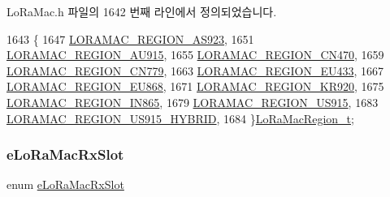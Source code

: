 Lo\+Ra\+Mac.\+h 파일의 1642 번째 라인에서 정의되었습니다.


\begin{DoxyCode}
1643 \{
1647     \mbox{\hyperlink{group___l_o_r_a_m_a_c_gga5d863ec55bc300e0ffeef88bcbeb70afa5b791cd5d892cd4ffdc891177f9c424f}{LORAMAC\_REGION\_AS923}},
1651     \mbox{\hyperlink{group___l_o_r_a_m_a_c_gga5d863ec55bc300e0ffeef88bcbeb70afa31c5134a31ba71dd67fffc7cd2e8d402}{LORAMAC\_REGION\_AU915}},
1655     \mbox{\hyperlink{group___l_o_r_a_m_a_c_gga5d863ec55bc300e0ffeef88bcbeb70afa8bf5c395dec14c8c24bc629e9cb4ab64}{LORAMAC\_REGION\_CN470}},
1659     \mbox{\hyperlink{group___l_o_r_a_m_a_c_gga5d863ec55bc300e0ffeef88bcbeb70afaa462c6a59045bcdbe27177b3c7d91ed0}{LORAMAC\_REGION\_CN779}},
1663     \mbox{\hyperlink{group___l_o_r_a_m_a_c_gga5d863ec55bc300e0ffeef88bcbeb70afa484c9c5522a1bd8411920cc7703d3977}{LORAMAC\_REGION\_EU433}},
1667     \mbox{\hyperlink{group___l_o_r_a_m_a_c_gga5d863ec55bc300e0ffeef88bcbeb70afadbfed23153fb6254b9ca2301ec19c24f}{LORAMAC\_REGION\_EU868}},
1671     \mbox{\hyperlink{group___l_o_r_a_m_a_c_gga5d863ec55bc300e0ffeef88bcbeb70afa2f45370a935e8767a90e19e24101f859}{LORAMAC\_REGION\_KR920}},
1675     \mbox{\hyperlink{group___l_o_r_a_m_a_c_gga5d863ec55bc300e0ffeef88bcbeb70afa58507c2e7248ab724cd3e0d0144ebd77}{LORAMAC\_REGION\_IN865}},
1679     \mbox{\hyperlink{group___l_o_r_a_m_a_c_gga5d863ec55bc300e0ffeef88bcbeb70afab2c106945b06878a5ded0cb466330412}{LORAMAC\_REGION\_US915}},
1683     \mbox{\hyperlink{group___l_o_r_a_m_a_c_gga5d863ec55bc300e0ffeef88bcbeb70afa973a53fba592cda6ade4592cf7b814b0}{LORAMAC\_REGION\_US915\_HYBRID}},
1684 \}\mbox{\hyperlink{group___l_o_r_a_m_a_c_ga80c48efda9ae02e14b58160d34a798dd}{LoRaMacRegion\_t}};
\end{DoxyCode}
\mbox{\label{group___l_o_r_a_m_a_c_ga933a5a2f7d57b1a5cb22f061e30558fe}} 
\subsubsection{\texorpdfstring{e\+Lo\+Ra\+Mac\+Rx\+Slot}{eLoRaMacRxSlot}}
{\footnotesize\ttfamily enum \mbox{\hyperlink{group___l_o_r_a_m_a_c_ga933a5a2f7d57b1a5cb22f061e30558fe}{e\+Lo\+Ra\+Mac\+Rx\+Slot}}}

